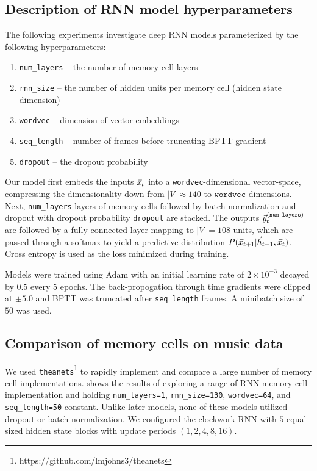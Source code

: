 \subsection{Description of RNN model hyperparameters}

The following experiments investigate deep RNN models parameterized by the
following hyperparameters:
\begin{enumerate}
  \item \texttt{num\_layers} -- the number of memory cell layers
  \item \texttt{rnn\_size} -- the number of hidden units per memory cell (\ie hidden state dimension)
  \item \texttt{wordvec} -- dimension of vector embeddings
  \item \texttt{seq\_length} -- number of frames before truncating BPTT gradient
  \item \texttt{dropout} -- the dropout probability
\end{enumerate}


Our model first embeds the inputs $\vec{x}_t$ into a \texttt{wordvec}-dimensional
vector-space, compressing the dimensionality down from $|V| \approx 140$ to
$\texttt{wordvec}$ dimensions. Next, \texttt{num\_layers} layers of memory
cells followed by batch normalization \citep{ioffe2015batch} and dropout
\citep{hinton2012improving} with dropout probability \texttt{dropout} are
stacked. The outputs $\vec{y}^{(\texttt{num\_layers})}_t$ are followed by a
fully-connected layer mapping to $|V| = 108$ units, which are passed through a
softmax to yield a predictive distribution $P(\vec{x}_{t+1} | \vec{h}_{t-1}, \vec{x}_{t})$.
Cross entropy is used as the loss minimized during training.

Models were trained using Adam \citep{kingma2014adam} with an initial learning
rate of $2 \times 10^{-3}$ decayed by $0.5$ every $5$ epochs. The
back-propogation through time gradients were clipped at $\pm5.0$
\citep{Pascanu2012} and BPTT was truncated after \texttt{seq\_length} frames. A
minibatch size of $50$ was used.

\subsection{Comparison of memory cells on music data}

We used \texttt{theanets}\footnote{https://github.com/lmjohns3/theanets} to
rapidly implement and compare a large number of memory cell implementations.
 shows the results of exploring a range of RNN
memory cell implementation and holding \texttt{num\_layers=1},
\texttt{rnn\_size=130}, \texttt{wordvec=64}, and \texttt{seq\_length=50}
constant. Unlike later models, none of these models utilized dropout or batch
normalization. We configured the clockwork RNN \citep{cho2014learning} with $5$
equal-sized hidden state blocks with update periods $(1, 2, 4, 8, 16)$.

